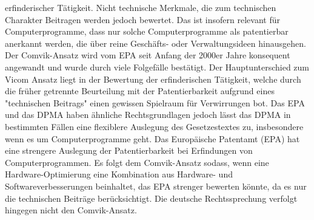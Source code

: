 erfinderischer Tätigkeit. Nicht technische Merkmale,
die zum technischen Charakter Beitragen werden jedoch bewertet.
Das ist insofern relevant für Computerprogramme,
dass nur solche Computerprogramme als patentierbar anerkannt werden, 
die über reine Geschäfts- oder Verwaltungsideen hinausgehen.
Der Comvik-Ansatz wird vom EPA seit Anfang der 2000er Jahre 
konsequent angewandt und 
wurde durch viele Folgefälle bestätigt.
Der Hauptunterschied zum Vicom Ansatz liegt in der
Bewertung der erfinderischen Tätigkeit, welche durch
die früher getrennte Beurteilung mit 
der Patentierbarkeit aufgrund eines "technischen Beitrags"
einen gewissen Spielraum für Verwirrungen bot.
Das EPA und das DPMA haben ähnliche Rechtsgrundlagen
jedoch lässt das DPMA in bestimmten Fällen 
eine flexiblere Auslegung des Gesetzestextes zu, 
insbesondere wenn es um Computerprogramme geht.
Das Europäische Patentamt (EPA) hat eine strengere Auslegung der Patentierbarkeit 
bei Erfindungen von Computerprogrammen. Es folgt dem Comvik-Ansatz
sodass,
wenn eine Hardware-Optimierung eine 
Kombination aus Hardware- und Softwareverbesserungen beinhaltet, das 
EPA strenger bewerten könnte, da es nur die technischen Beiträge berücksichtigt.
Die deutsche Rechtssprechung verfolgt hingegen nicht den Comvik-Ansatz.

